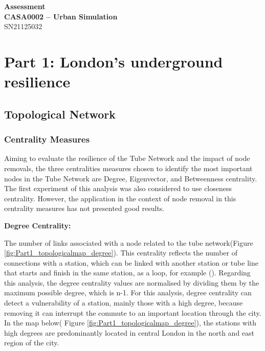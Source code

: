 \documentclass[10pt]{report}
\author{Felipe Santos Almeida}
\numberwithin{figure}{section}
\numberwithin{table}{section}
\begin{document}

\begin{center}
    \vspace*{-3cm}
\end{center}   
    {\LARGE\textbf{Assessment\\
    CASA0002 – Urban Simulation\\}}
SN21125032 

\vspace{5mm} %
  
\section{Part 1: London’s underground resilience}


 \subsection{Topological Network}
\subsubsection{Centrality Measures } 
        
         Aiming to evaluate the resilience of the Tube Network and the impact of node removals, the three centralities measures chosen to identify the most important nodes in the Tube Network are Degree, Eigenvector, and Betweenness centrality. The first experiment of this analysis was also considered to use closeness centrality. However, the application in the context of node removal in this centrality measures has not presented good results.  
        
        \vspace{5mm} %
        
        \textbf{Degree Centrality:} 
        
The number of links associated with a node related to the tube network(Figure \ref{fig:Part1_topologicalmap_degree}). This centrality reflects the number of connections with a station, which can be linked with another station or tube line that starts and finish in the same station, as a loop, for example (\cite{arcaute_review_2022}). Regarding this analysis, the degree centrality values are normalised by dividing them by the maximum possible degree, which is n-1. For this analysis, degree centrality can detect a vulnerability of a station, mainly those with a high degree, because removing it can interrupt the commute to an important location through the city.  In the map below( Figure \ref{fig:Part1_topologicalmap_degree}), the stations with high degrees are predominantly located in central London in the north and east region of the city.
\end{document}
